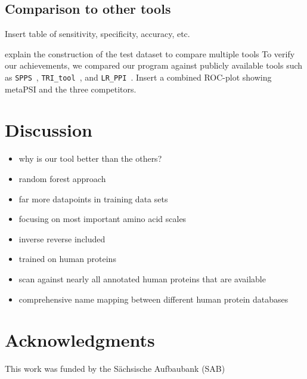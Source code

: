 \documentclass[preprint,3p,times,twocolumn]{elsarticle}
\newcommand{\TODO}[1] {\begingroup\color{red}#1\endgroup}
\newcommand{\spps}{\texttt{SPPS}}
\newcommand{\tri}{\texttt{TRI\_tool}}
\newcommand{\lr}{\texttt{LR\_PPI}}
\begin{document}
\subsection{Comparison to other tools}
\TODO{Insert table of sensitivity, specificity, accuracy, etc.}

\TODO{explain the construction of the test dataset to compare multiple tools}
To verify our achievements, we compared our program against publicly available tools such as \spps\ \cite{Liu:2012}, \tri\ \cite{Perovic:2017}, and \lr\ \cite{Pan:2010}.
\TODO{Insert a combined ROC-plot showing metaPSI and the three competitors.}

\section{Discussion}
\begin{itemize}
\item why is our tool better than the others?
\item random forest approach
\item far more datapoints in training data sets
\item focusing on most important amino acid scales
\item inverse reverse included
\item trained on human proteins
\item scan against nearly all annotated human proteins that are available
\item comprehensive name mapping between different human protein databases
\end{itemize}



\section*{Acknowledgments}

This work was funded by the S\"achsische Aufbaubank (SAB)



\end{document}
